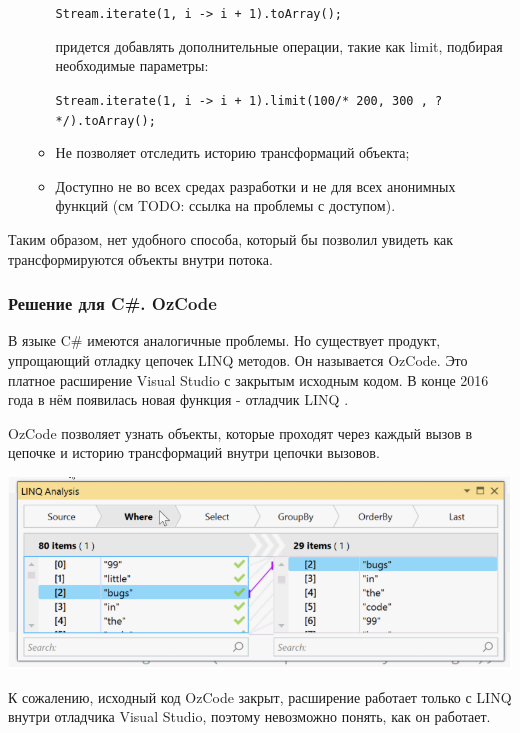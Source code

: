 \begin{itemize}
\begin{itemize}
		\texttt{Stream.iterate(1, i -> i + 1).toArray();}
		
		придется добавлять дополнительные операции, такие как limit, подбирая необходимые параметры:
		
		\texttt{Stream.iterate(1, i -> i + 1).limit(100/* 200, 300 , ? */).toArray();}
		\item Не позволяет отследить историю трансформаций объекта;
		\item Доступно не во всех средах разработки и не для всех анонимных функций (см TODO: ссылка на проблемы с доступом).
	\end{itemize}
\end{itemize}

Таким образом, нет удобного способа, который бы позволил увидеть как трансформируются объекты внутри потока.

\subsubsection{Решение для C\#. OzCode}
В языке C\# имеются аналогичные проблемы. Но существует продукт, упрощающий отладку цепочек LINQ методов. Он называется OzCode. Это платное расширение Visual Studio \cite{ms:vs} с закрытым исходным кодом. В конце 2016 года в нём появилась новая функция - отладчик LINQ \cite{ms:ozcode}.

OzCode позволяет узнать объекты, которые проходят через каждый вызов в цепочке и историю трансформаций внутри цепочки вызовов.

\includegraphics[scale=0.6]{chapter1/img/linq.png}

К сожалению, исходный код OzCode закрыт, расширение работает только с LINQ внутри отладчика Visual Studio, поэтому невозможно понять, как он работает. 
